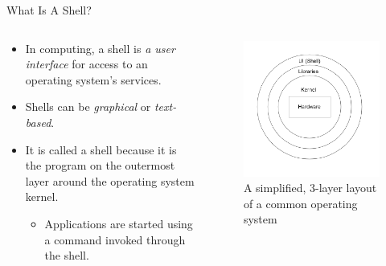\documentclass[11pt]{beamer}
\begin{document}
\begin{frame}[t]{What Is A Shell?}
	\begin{columns}
		\begin{column}{0.5\textwidth}
			\begin{itemize}
				\item In computing, a shell is \textit{a user interface} for access to an operating system's services.
				\item Shells can be \textit{graphical} or \textit{text-based}.
				\item It is called a shell because it is the program on the outermost layer around the operating system kernel.
				\begin{itemize}
					\item Applications are started using a command invoked through the shell.
				\end{itemize}
			\end{itemize}
		\end{column}
		\begin{column}{0.5\textwidth}
			\vspace{-5mm}
			\begin{figure}
				\includegraphics[scale=0.25]{os-layers.png}
				\caption{A simplified, 3-layer layout of a common operating system}
			\end{figure}
		\end{column}
	\end{columns}
\end{frame}
\end{document}

